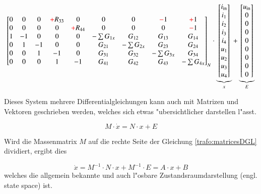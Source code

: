 \begin{refsection}
{\begin{align}
{\begin{bmatrix}
			0&0&0&\color{red}+\color{black}R_{33}&0 & 0&0&\color{red}-\color{black}1&\color{red}+\color{black}1 \\
			0&0&0&0&\color{red}+\color{black}R_{44} & 0&0&0&\color{red}-\color{black}1 \\
			1&-1&0&0&0 & -\sum G_{1x}&G_{12}&G_{13}&G_{14} \\
			0&1&-1&0&0 & G_{21} &- \sum G_{2x}& G_{23}& G_{24} \\
			0&0&1&-1&0 & G_{31} & G_{32} &-\sum G_{3x}&G_{34} \\
			0&0&0&1&-1 & G_{41}&G_{42}&G_{43}&-\sum G_{4x}
			\end{bmatrix}}_{\text{$N$}}
			\cdot
			\underbrace{\begin{bmatrix}
			i_\mathrm{in} \\
			i_1 \\
			i_2 \\
			i_3 \\
			i_4 \\
			u_1 \\
			u_2 \\
			u_3 \\
			u_4
			\end{bmatrix}}_{\text{$x$}}
			+
			\underbrace{\begin{bmatrix}
			u_\mathrm{in} \\
			0 \\
			0 \\
			0 \\
			0 \\
			0 \\
			0 \\
			0 \\
			0
			\end{bmatrix}}_{\text{$E$}}
			\label{trafo:symmetricalDGL}
\end{align}
}

Dieses System mehrere Differentialgleichungen kann auch mit Matrizen und Vektoren geschrieben werden, welches sich etwas "ubersichtlicher darstellen l"asst. 

\begin{equation}
	M \cdot \dot x = N \cdot x + E
	\label{trafo:matricesDGL}
\end{equation}

Wird die Massenmatrix $M$ auf die rechte Seite der Gleichung \ref{trafo:matricesDGL} dividiert, ergibt dies

\begin{equation}
	\dot{x} = M^{-1} \cdot N \cdot x + M^{-1} \cdot E = A \cdot x + B
\end{equation}
welches die allgemein bekannte und auch l"osbare Zustandsraumdarstellung  (engl. state space) ist.


\end{refsection}
